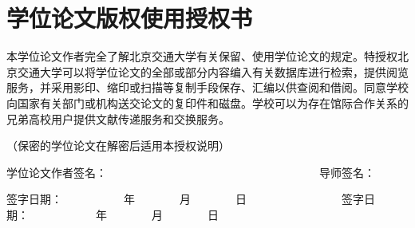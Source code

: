 
\chapter*{学位论文版权使用授权书}
\thispagestyle{empty}
本学位论文作者完全了解北京交通大学有关保留、使用学位论文的规定。特授权北京交通大学可以将学位论文的全部或部分内容编入有关数据库进行检索，提供阅览服务，并采用影印、缩印或扫描等复制手段保存、汇编以供查阅和借阅。同意学校向国家有关部门或机构送交论文的复印件和磁盘。学校可以为存在馆际合作关系的兄弟高校用户提供文献传递服务和交换服务。

（保密的学位论文在解密后适用本授权说明）


\vspace{72pt}
学位论文作者签名：~~~~~~~~~~~~~~~~~~~~~~~~~~~~~~~~~~~~~~导师签名：
	
\vspace{12pt}
签字日期：~~~~~~~~~~~年~~~~~~~~月~~~~~~~~日~~~~~~~~~~~~~~~~~签字日期：~~~~~~~~~~~~年~~~~~~~~月~~~~~~~~日 








